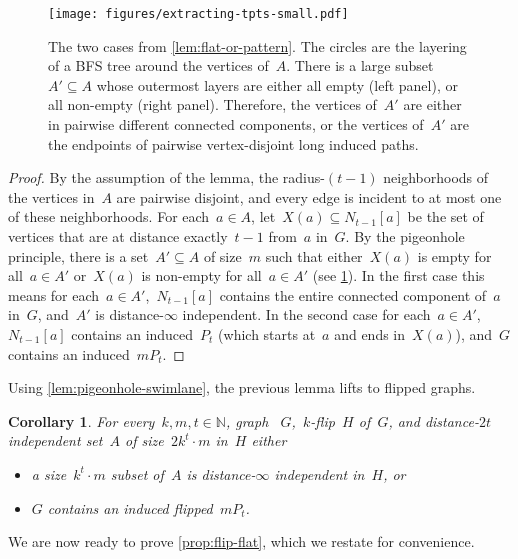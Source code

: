 \documentclass[11pt]{article}      \usepackage[margin=1in]{geometry}  \usepackage{microtype}
\newtheorem{corollary}[theorem]{Corollary}
\theoremstyle{definition}
\newcommand{\N}[0]{\mathrm{\mathbb{N}}}
\begin{document}
\begin{figure}[htbp]
  \centering
  \texttt{[image: figures/extracting-tpts-small.pdf]}
  \caption{The two cases from \cref{lem:flat-or-pattern}.
  The circles are the layering of a BFS tree around the vertices of~$A$.
  There is a large subset~$A'\subseteq A$ whose outermost layers are either all empty (left panel), or all non-empty (right panel).
  Therefore, the vertices of~$A'$ are either in pairwise different connected components, or the vertices of~$A'$ are the endpoints of pairwise vertex-disjoint long induced paths.
  }
  \label{fig:flat-or-pattern}
\end{figure}

\begin{proof}
  By the assumption of the lemma, the radius-$(t-1)$ neighborhoods of the vertices in~$A$ are pairwise disjoint, and every edge is incident to at most one of these neighborhoods.
  For each~$a \in A$, let~$X(a) \subseteq N_{t-1}[a]$ be the set of vertices that are at distance exactly~$t-1$ from~$a$ in~$G$.
  By the pigeonhole principle, there is a set~$A' \subseteq A$ of size~$m$ such that either~$X(a)$ is empty for all~$a \in A'$ or~$X(a)$ is non-empty for all~$a \in A'$ (see \cref{fig:flat-or-pattern}).
  In the first case this means for each~$a \in A'$,~$N_{t-1}[a]$ contains the entire connected component of~$a$ in~$G$,
  and~$A'$ is distance-$\infty$ independent.
  In the second case for each~$a \in A'$,~$N_{t-1}[a]$ contains an induced~$P_t$ (which starts at~$a$ and ends in~$X(a)$), and~$G$ contains an induced~$mP_t$.
\end{proof}



Using \cref{lem:pigeonhole-swimlane}, the previous lemma lifts to flipped graphs.

\begin{corollary}\label{cor:infty-flip-flat-engine}
  For every~$k,m,t \in \N$, graph 
 ~$G$,~$k$-flip~$H$ of~$G$, and distance-$2t$ independent set~$A$ of size~$2k^t \cdot m$ in~$H$ either 
  \begin{itemize}
    \item a size~$k^t \cdot m$ subset of~$A$ is distance-$\infty$ independent in~$H$, or
    \item $G$ contains an induced flipped~$mP_t$.
  \end{itemize}
\end{corollary}

We are now ready to prove \cref{prop:flip-flat}, which we restate for convenience.
\end{document}

